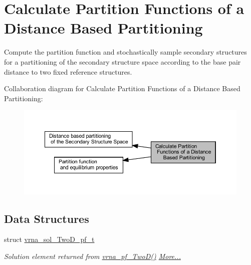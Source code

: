 \hypertarget{group__kl__neighborhood__pf}{}\section{Calculate Partition Functions of a Distance Based Partitioning}
\label{group__kl__neighborhood__pf}


Compute the partition function and stochastically sample secondary structures for a partitioning of the secondary structure space according to the base pair distance to two fixed reference structures.  


Collaboration diagram for Calculate Partition Functions of a Distance Based Partitioning\+:
\nopagebreak
\begin{figure}[H]
\begin{center}
\leavevmode
\includegraphics[width=350pt]{group__kl__neighborhood__pf}
\end{center}
\end{figure}
\subsection*{Data Structures}
\begin{DoxyCompactItemize}
\item 
struct \hyperlink{group__kl__neighborhood__pf_structvrna__sol__TwoD__pf__t}{vrna\+\_\+sol\+\_\+\+Two\+D\+\_\+pf\+\_\+t}
\begin{DoxyCompactList}\small\item\em Solution element returned from \hyperlink{group__kl__neighborhood__pf_ga0bc3427689bd09da09b8b3094a27f836}{vrna\+\_\+pf\+\_\+\+Two\+D()}  \hyperlink{group__kl__neighborhood__pf_structvrna__sol__TwoD__pf__t}{More...}\end{DoxyCompactList}\end{DoxyCompactItemize}

